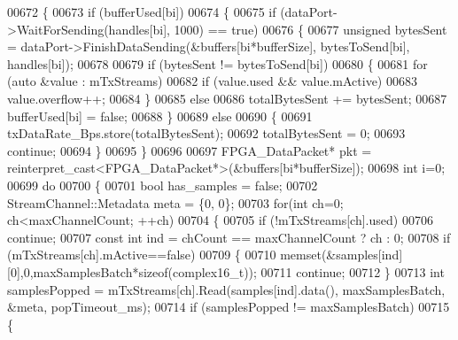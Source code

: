 \begin{DoxyCode}
00672     \{
00673         \textcolor{keywordflow}{if} (bufferUsed[bi])
00674         \{
00675             \textcolor{keywordflow}{if} (dataPort->WaitForSending(handles[bi], 1000) == \textcolor{keyword}{true})
00676             \{
00677                 \textcolor{keywordtype}{unsigned} bytesSent = dataPort->FinishDataSending(&buffers[bi*bufferSize], bytesToSend[bi], 
      handles[bi]);
00678 
00679                 \textcolor{keywordflow}{if} (bytesSent != bytesToSend[bi])
00680                 \{
00681                     \textcolor{keywordflow}{for} (\textcolor{keyword}{auto} &value : mTxStreams)
00682                         \textcolor{keywordflow}{if} (value.used && value.mActive)
00683                             value.overflow++;
00684                 \}
00685                 \textcolor{keywordflow}{else}
00686                     totalBytesSent += bytesSent;
00687                 bufferUsed[bi] = \textcolor{keyword}{false};
00688             \}
00689             \textcolor{keywordflow}{else}
00690             \{
00691                 txDataRate_Bps.store(totalBytesSent);
00692                 totalBytesSent = 0;
00693                 \textcolor{keywordflow}{continue};
00694             \}
00695         \}
00696 
00697         FPGA_DataPacket* pkt = \textcolor{keyword}{reinterpret\_cast<}FPGA_DataPacket*\textcolor{keyword}{>}(&buffers[bi*bufferSize]);
00698         \textcolor{keywordtype}{int} i=0;
00699         \textcolor{keywordflow}{do}
00700         \{
00701             \textcolor{keywordtype}{bool} has\_samples = \textcolor{keyword}{false};
00702             StreamChannel::Metadata meta = \{0, 0\};
00703             \textcolor{keywordflow}{for}(\textcolor{keywordtype}{int} ch=0; ch<maxChannelCount; ++ch)
00704             \{
00705                 \textcolor{keywordflow}{if} (!mTxStreams[ch].used)
00706                     \textcolor{keywordflow}{continue};
00707                 \textcolor{keyword}{const} \textcolor{keywordtype}{int} ind = chCount == maxChannelCount ? ch : 0;
00708                 \textcolor{keywordflow}{if} (mTxStreams[ch].mActive==\textcolor{keyword}{false})
00709                 \{
00710                     memset(&samples[ind][0],0,maxSamplesBatch*\textcolor{keyword}{sizeof}(complex16_t));
00711                     \textcolor{keywordflow}{continue};
00712                 \}
00713                 \textcolor{keywordtype}{int} samplesPopped = mTxStreams[ch].Read(samples[ind].data(), maxSamplesBatch, &meta, 
      popTimeout\_ms);
00714                 \textcolor{keywordflow}{if} (samplesPopped != maxSamplesBatch)
00715                 \{

\end{DoxyCode}

